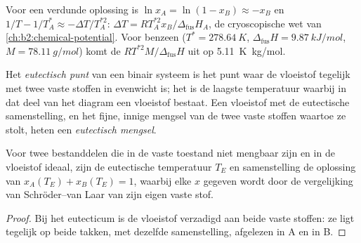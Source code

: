 Voor een verdunde oplossing is $\ln x_A = \ln(1 - x_B) \approx -x_B$ en $1/T -
1/T_A^* \approx -\Delta T/T_A^{*2}$: $\Delta T = RT_A^{*2}x_B/\Delta_{\text{fus}}H_A$,
de cryoscopische wet van \cref{ch:b2:chemical-potential}. Voor benzeen ($T^* =
\qty{278.64}{K}$, $\Delta_{\text{fus}}H = \qty{9.87}{kJ/mol}$, $M =
\qty{78.11}{g/mol}$) komt de  $RT^{*2}M/\Delta_{\text{fus}}H$
uit op \qty{5.11}{K.kg/mol}.

\begin{definition}[Eutecticum]\label{def:b2:solid-liquid-diagrams:eutectic}
Het \emph{eutectisch punt} van een binair systeem is het
punt waar de vloeistof tegelijk met twee vaste stoffen in evenwicht is; het is de
laagste temperatuur waarbij in dat deel van het diagram een vloeistof bestaat. Een
vloeistof met de eutectische samenstelling, en het fijne, innige mengsel van de twee
vaste stoffen waartoe ze stolt, heten een \emph{eutectisch
mengsel}.
\end{definition}

\begin{corollary}\label{cor:b2:solid-liquid-diagrams:eutectic}
Voor twee bestanddelen die in de vaste toestand niet mengbaar zijn en in de vloeistof ideaal, zijn de
eutectische temperatuur $T_E$ en samenstelling de oplossing van
$x_A(T_E) + x_B(T_E) = 1$, waarbij elke $x$ gegeven wordt door de vergelijking van
Schröder--van Laar van zijn eigen vaste stof.
\end{corollary}

\begin{proof}
Bij het eutecticum is de vloeistof verzadigd aan beide vaste stoffen: ze ligt tegelijk op beide
takken, met dezelfde samenstelling, afgelezen in A en in B.
\end{proof}

